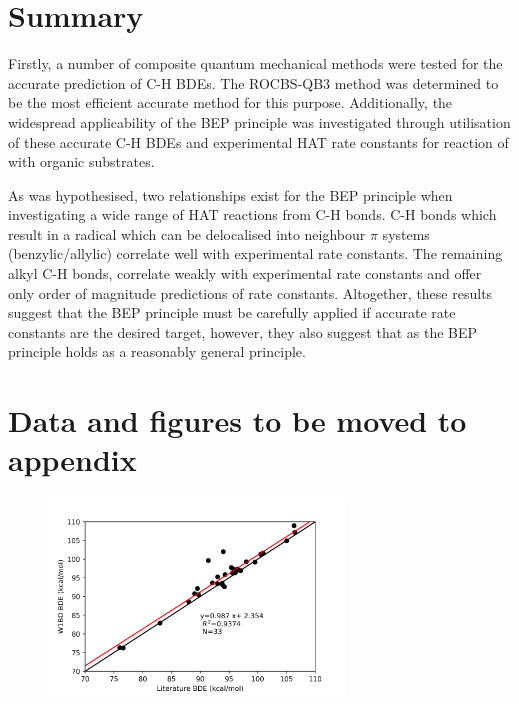 
\section{Summary}

Firstly, a number of composite quantum mechanical methods were tested for the accurate prediction of C-H BDEs. The ROCBS-QB3 method was determined to be the most efficient accurate method for this purpose. Additionally, the widespread applicability of the BEP principle was investigated through utilisation of these accurate C-H BDEs and experimental HAT rate constants for reaction of \cumo with organic substrates.

As was hypothesised, two relationships exist for the BEP principle when investigating a wide range of HAT reactions from C-H bonds. C-H bonds which result in a radical which can be delocalised into neighbour $\pi$ systems (benzylic/allylic) correlate well with experimental rate constants. The remaining alkyl C-H bonds, correlate weakly with experimental rate constants and offer only order of magnitude predictions of rate constants. Altogether, these results suggest that the BEP principle must be carefully applied if accurate rate constants are the desired target, however, they also suggest that as the BEP principle holds as a reasonably general principle.

\newpage
\section{Data and figures to be moved to appendix}

\begin{figure}
  \centering
  \includegraphics[width=0.7\textwidth]{figures/lit-w1bd}
\end{figure}


